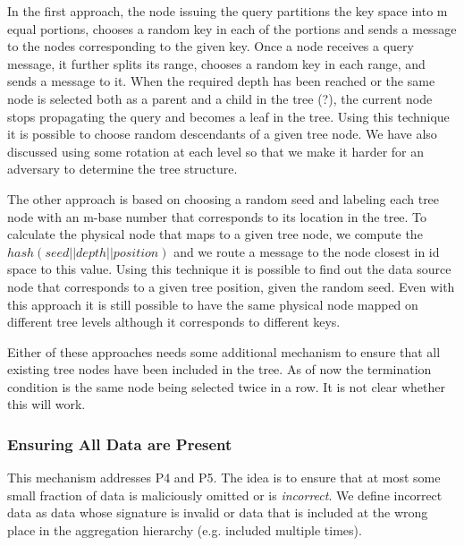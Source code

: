 \documentclass{article}
\begin{document}
In the first approach, the node issuing the
query partitions the key space into m equal portions, chooses a random
key in each of the portions and sends a message to the nodes
corresponding to the given key. Once a node receives a query message,
it further splits its range, chooses a random key in each range, and
sends a message to it. When the required depth has been reached or the
same node is selected both as a parent and a child in the tree (?),
the current node stops propagating the query and becomes a leaf in the
tree. Using this technique it is possible to choose random descendants
of a given tree node. We have also discussed using some rotation at
each level so that we make it harder for an adversary to determine
the tree structure.

The other approach is based on choosing a random seed and labeling
each tree node with an m-base number that corresponds to its location
in the tree. To calculate the physical node that maps to a given tree
node, we compute the
$hash(seed||depth||position)$ and we route a message to the node
closest in id space to this value. Using this technique it is possible to 
find out the data source node that corresponds to a given tree
position, given the random seed. Even with this approach it is still
possible to have the same physical node mapped on different tree
levels although it corresponds to different keys.


Either of these approaches needs some additional mechanism to ensure
that all existing tree nodes have been included in the tree. As of now
the termination condition is the same node being selected twice in a
row. It is not clear whether this will work.

\subsubsection{Ensuring All Data are Present}
This mechanism addresses P4 and P5. The idea is to ensure that at most
some small fraction of data is maliciously omitted or is \emph{incorrect}. We
define incorrect data as data whose signature is invalid or data that
is included at the wrong place in the aggregation hierarchy
(e.g. included multiple times). 
\end{document}
